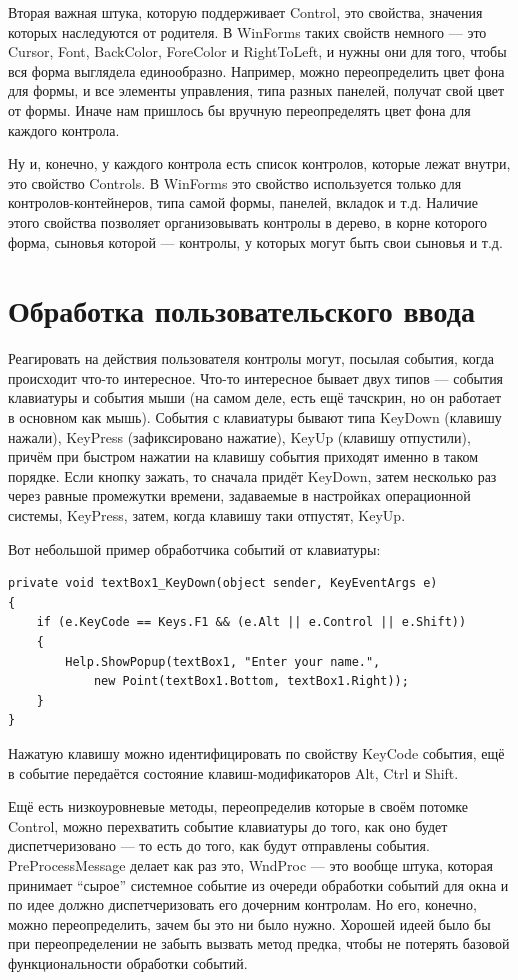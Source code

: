 \documentclass[a5paper]{article}
\begin{document}
Вторая важная штука, которую поддерживает Control, это свойства, значения которых наследуются от родителя. В WinForms таких свойств немного --- это Cursor, Font, BackColor, ForeColor и RightToLeft, и нужны они для того, чтобы вся форма выглядела единообразно. Например, можно переопределить цвет фона для формы, и все элементы управления, типа разных панелей, получат свой цвет от формы. Иначе нам пришлось бы вручную переопределять цвет фона для каждого контрола.

Ну и, конечно, у каждого контрола есть список контролов, которые лежат внутри, это свойство Controls. В WinForms это свойство используется только для контролов-контейнеров, типа самой формы, панелей, вкладок и т.д. Наличие этого свойства позволяет организовывать контролы в дерево, в корне которого форма, сыновья которой --- контролы, у которых могут быть свои сыновья и т.д.

\section{Обработка пользовательского ввода}

Реагировать на действия пользователя контролы могут, посылая события, когда происходит что-то интересное. Что-то интересное бывает двух типов --- события клавиатуры и события мыши (на самом деле, есть ещё тачскрин, но он работает в основном как мышь). События с клавиатуры бывают типа KeyDown (клавишу нажали), KeyPress (зафиксировано нажатие), KeyUp (клавишу отпустили), причём при быстром нажатии на клавишу события приходят именно в таком порядке. Если кнопку зажать, то сначала придёт KeyDown, затем несколько раз через равные промежутки времени, задаваемые в настройках операционной системы, KeyPress, затем, когда клавишу таки отпустят, KeyUp. 

Вот небольшой пример обработчика событий от клавиатуры: 

\begin{verbatim}
private void textBox1_KeyDown(object sender, KeyEventArgs e)
{
    if (e.KeyCode == Keys.F1 && (e.Alt || e.Control || e.Shift))
    {
        Help.ShowPopup(textBox1, "Enter your name.", 
            new Point(textBox1.Bottom, textBox1.Right));
    }
}
\end{verbatim}

Нажатую клавишу можно идентифицировать по свойству KeyCode события, ещё в событие передаётся состояние клавиш-модификаторов Alt, Ctrl и Shift. 

Ещё есть низкоуровневые методы, переопределив которые в своём потомке Control, можно перехватить событие клавиатуры до того, как оно будет диспетчеризовано --- то есть до того, как будут отправлены события. PreProcessMessage делает как раз это, WndProc --- это вообще штука, которая принимает ``сырое'' системное событие из очереди обработки событий для окна и по идее должно диспетчеризовать его дочерним контролам. Но его, конечно, можно переопределить, зачем бы это ни было нужно. Хорошей идеей было бы при переопределении не забыть вызвать метод предка, чтобы не потерять базовой функциональности обработки событий.
\end{document}

